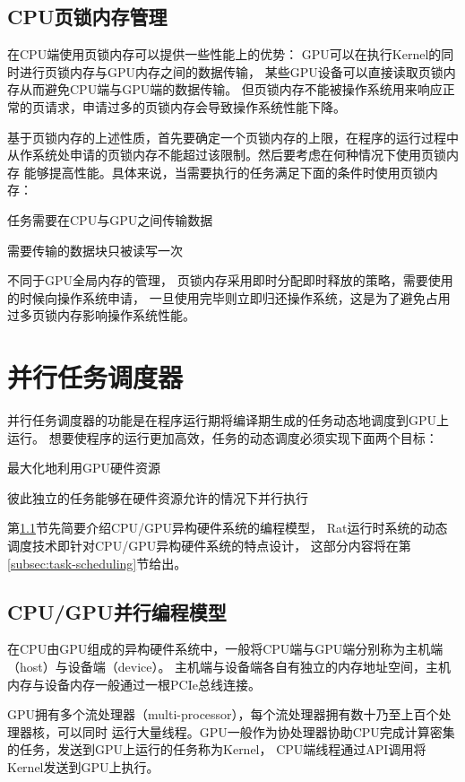 \subsection{CPU页锁内存管理}
在CPU端使用页锁内存可以提供一些性能上的优势：
GPU可以在执行Kernel的同时进行页锁内存与GPU内存之间的数据传输，
某些GPU设备可以直接读取页锁内存从而避免CPU端与GPU端的数据传输。
但页锁内存不能被操作系统用来响应正常的页请求，申请过多的页锁内存会导致操作系统性能下降。

基于页锁内存的上述性质，首先要确定一个页锁内存的上限，在程序的运行过程中
从作系统处申请的页锁内存不能超过该限制。然后要考虑在何种情况下使用页锁内存
能够提高性能。具体来说，当需要执行的任务满足下面的条件时使用页锁内存：
\begin{compactitem}
  \item 任务需要在CPU与GPU之间传输数据
  \item 需要传输的数据块只被读写一次
\end{compactitem}

不同于GPU全局内存的管理，
页锁内存采用即时分配即时释放的策略，需要使用的时候向操作系统申请，
一旦使用完毕则立即归还操作系统，这是为了避免占用过多页锁内存影响操作系统性能。

\section{并行任务调度器}\label{sec:task-scheduler}
并行任务调度器的功能是在程序运行期将编译期生成的任务动态地调度到GPU上运行。
想要使程序的运行更加高效，任务的动态调度必须实现下面两个目标：
\begin{compactitem}
  \item 最大化地利用GPU硬件资源
  \item 彼此独立的任务能够在硬件资源允许的情况下并行执行
\end{compactitem}

第\ref{cpu-gpu-model}节先简要介绍CPU/GPU异构硬件系统的编程模型，
Rat运行时系统的动态调度技术即针对CPU/GPU异构硬件系统的特点设计，
这部分内容将在第\ref{subsec:task-scheduling}节给出。

\subsection{CPU/GPU并行编程模型}\label{cpu-gpu-model}
在CPU由GPU组成的异构硬件系统中，一般将CPU端与GPU端分别称为主机端（host）与设备端（device）。
主机端与设备端各自有独立的内存地址空间，主机内存与设备内存一般通过一根PCIe总线连接。

GPU拥有多个流处理器（multi-processor），每个流处理器拥有数十乃至上百个处理器核，可以同时
运行大量线程。GPU一般作为协处理器协助CPU完成计算密集的任务，发送到GPU上运行的任务称为Kernel，
CPU端线程通过API调用将Kernel发送到GPU上执行。

